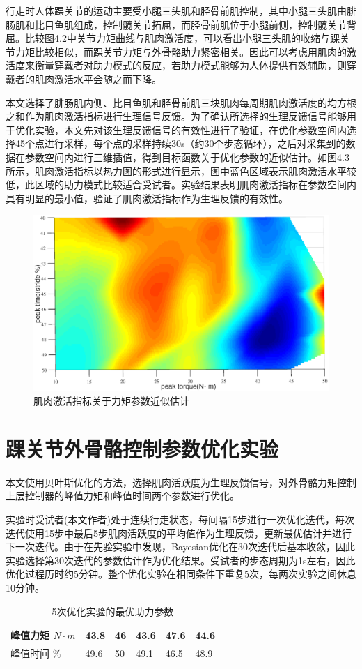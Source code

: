 行走时人体踝关节的运动主要受小腿三头肌和胫骨前肌控制，其中小腿三头肌由腓肠肌和比目鱼肌组成，控制髋关节拓屈，而胫骨前肌位于小腿前侧，控制髋关节背屈。比较图4.2中关节力矩曲线与肌肉激活度，可以看出小腿三头肌的收缩与踝关节力矩比较相似，而踝关节力矩与外骨骼助力紧密相关。因此可以考虑用肌肉的激活度来衡量穿戴者对助力模式的反应，若助力模式能够为人体提供有效辅助，则穿戴者的肌肉激活水平会随之而下降。

本文选择了腓肠肌内侧、比目鱼肌和胫骨前肌三块肌肉每周期肌肉激活度的均方根之和作为肌肉激活指标进行生理信号反馈。为了确认所选择的生理反馈信号能够用于优化实验，本文先对该生理反馈信号的有效性进行了验证，在优化参数空间内选择45个点进行采样，每个点的采样持续30s（约30个步态循环），之后对采集到的数据在参数空间内进行三维插值，得到目标函数关于优化参数的近似估计。如图4.3所示，肌肉激活指标以热力图的形式进行显示，图中蓝色区域表示肌肉激活水平较低，此区域的助力模式比较适合受试者。实验结果表明肌肉激活指标在参数空间内具有明显的最小值，验证了肌肉激活指标作为生理反馈的有效性。
\begin{figure}[!htb]
    \includegraphics[width=17cm]{fig/f63.eps}
    \caption{肌肉激活指标关于力矩参数近似估计}
    \label{fig:mark}
\end{figure}

\section{踝关节外骨骼控制参数优化实验}

本文使用贝叶斯优化的方法，选择肌肉活跃度为生理反馈信号，对外骨骼力矩控制上层控制器的峰值力矩和峰值时间两个参数进行优化。

实验时受试者(本文作者)处于连续行走状态，每间隔15步进行一次优化迭代，每次迭代使用15步中最后5步肌肉活跃度的平均值作为生理反馈，更新最优估计并进行下一次迭代。由于在先验实验中发现，Bayesian优化在30次迭代后基本收敛，因此实验选择第30次迭代的参数估计作为优化结果。受试者的步态周期为1s左右，因此优化过程历时约5分钟。整个优化实验在相同条件下重复5次，每两次实验之间休息10分钟。
\begin{table}[htb]
    \caption[控制参数]{5次优化实验的最优助力参数}
    \begin{tabular}{llllll}
      \toprule
        峰值力矩 $N\cdot m$ & 43.8 & 46 & 43.6 & 47.6 & 44.6 \\
      \midrule
        峰值时间 $\%$ & 49.6 & 50 & 49.1 & 46.5 & 48.9 \\
      \bottomrule
    \end{tabular}
\end{table}

